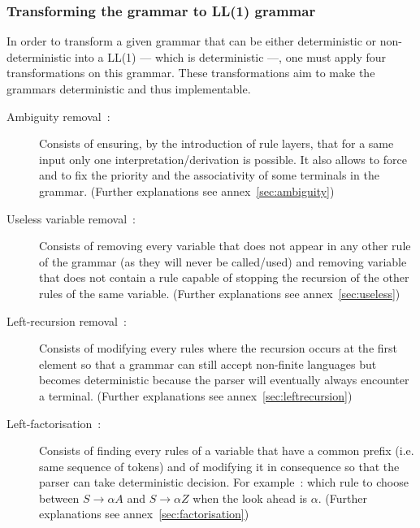 \documentclass[a4paper,11pt]{article}
\begin{document}
    \subsubsection{Transforming the grammar to LL(1) grammar}
      \label{grammartoll1methods}
      In order to transform a given grammar that can be either deterministic or non-deterministic into a LL(1) --- which is deterministic ---, one must apply four transformations on this grammar. These transformations aim to make the grammars deterministic and thus implementable.
      \begin{description}
        \item[Ambiguity removal~:] Consists of ensuring, by the introduction of rule layers, that for a same input only one interpretation/derivation is possible. It also allows to force and to fix the priority and the associativity of some terminals in the grammar. (Further explanations see annex~\ref{sec:ambiguity})
        \item[Useless variable removal~:] Consists of removing every variable that does not appear in any other rule of the grammar (as they will never be called/used) and removing variable that does not contain a rule capable of stopping the recursion of the other rules of the same variable. (Further explanations see annex~\ref{sec:useless})
        \item[Left-recursion removal~:] Consists of modifying every rules where the recursion occurs at the first element so that a grammar can still accept non-finite languages but becomes deterministic because the parser will eventually always encounter a terminal. (Further explanations see annex~\ref{sec:leftrecursion})
        \item[Left-factorisation~:] Consists of finding every rules of a variable that have a common prefix (i.e. same sequence of tokens) and of modifying it in consequence so that the parser can take deterministic decision. For example~: which rule to choose between $S \rightarrow \alpha A$ and $S \rightarrow \alpha Z$ when the look ahead is $\alpha$. (Further explanations see annex~\ref{sec:factorisation})
      \end{description}
  
\end{document}
